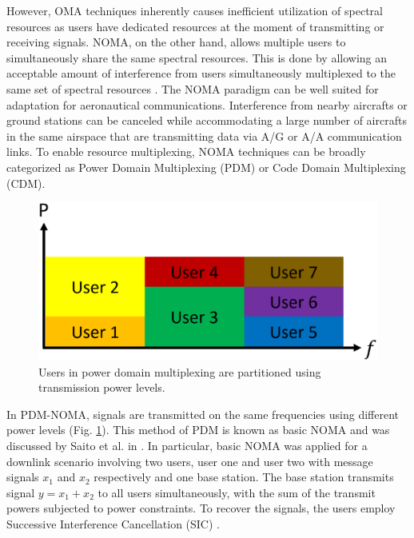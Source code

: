 However, OMA techniques inherently causes inefficient utilization of spectral resources as users have dedicated resources at the moment of transmitting or receiving signals. NOMA, on the other hand, allows multiple users to simultaneously share the same spectral resources. This is done by allowing an acceptable amount of interference from users simultaneously multiplexed to the same set of spectral resources \cite{dai2015non}. The NOMA paradigm can be well suited for adaptation for aeronautical communications. Interference from nearby aircrafts or ground stations can be canceled while accommodating a large number of aircrafts in the same airspace that are transmitting data via A/G or A/A communication links. To enable resource multiplexing, NOMA techniques can be broadly categorized as Power Domain Multiplexing (PDM) or Code Domain Multiplexing (CDM). 

\begin{figure} []
\centering
\vspace{-0.7in}
\includegraphics [width=0.6\columnwidth]{chap2_fig/NOMA_fig1.eps}  %
\vspace{-0.8in}
\caption{Users in power domain multiplexing are partitioned using transmission power levels.}
\label{fig:6}
\end{figure}

In PDM-NOMA, signals are transmitted on the same frequencies using different power levels (Fig. \ref{fig:6}). This method of PDM is known as basic NOMA and was discussed by Saito et al. in \cite{saito2013non}. In particular, basic NOMA was applied for a downlink scenario involving two users, user one and user two with message signals $x_1$ and $x_2$ respectively and one base station. The base station transmits signal $y=x_1+x_2$ to all users simultaneously, with the sum of the transmit powers subjected to power constraints. To recover the signals, the users employ Successive Interference Cancellation (SIC) \cite{saito2013non}. 

